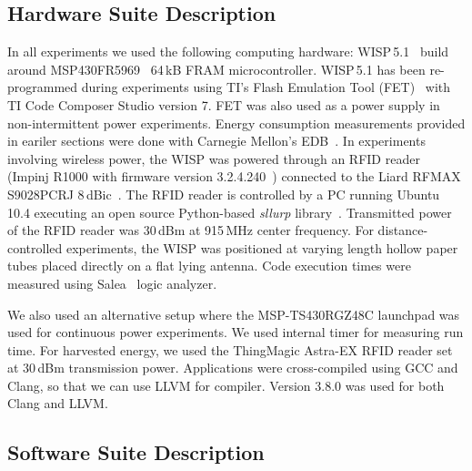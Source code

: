 
\subsection{Hardware Suite Description}
\label{sec:results_hardware}

In all experiments we used the following computing hardware: WISP\,5.1~\cite{wisp5,wisp} build around MSP430FR5969~\cite{wolverine} 64\,kB FRAM microcontroller. WISP\,5.1 has been re-programmed during experiments using TI's Flash Emulation Tool (FET)~\cite{fet} with TI Code Composer Studio version 7. FET was also used as a power supply in non-intermittent power experiments. Energy consumption measurements provided in eariler sections were done with Carnegie Mellon's EDB~\cite{edb}. In experiments involving wireless power, the WISP was powered through an RFID reader (Impinj R1000 with firmware version 3.2.4.240~\cite{r1000_data_sheet}) connected to the Liard RFMAX S9028PCRJ 8\,dBic~\cite{atlas2015}. The RFID reader is controlled by a PC running Ubuntu 10.4 executing an open source Python-based \emph{sllurp} library~\cite{sllrp_github}. Transmitted power of the RFID reader was 30\,dBm at 915\,MHz center frequency. For distance-controlled experiments, the WISP was positioned at varying length hollow paper tubes placed directly on a flat lying antenna. Code execution times were measured using Salea~\cite{saleae} logic analyzer.

We also used an alternative setup where the MSP-TS430RGZ48C launchpad was used for continuous power experiments. We used internal timer for measuring run time. For harvested energy, we used the ThingMagic Astra-EX RFID reader set at 30\,dBm transmission power. Applications were cross-compiled using GCC and Clang, so that we can use LLVM for \sys compiler. Version 3.8.0 was used for both Clang and LLVM.

\subsection{Software Suite Description}
\label{sec:results_software}

